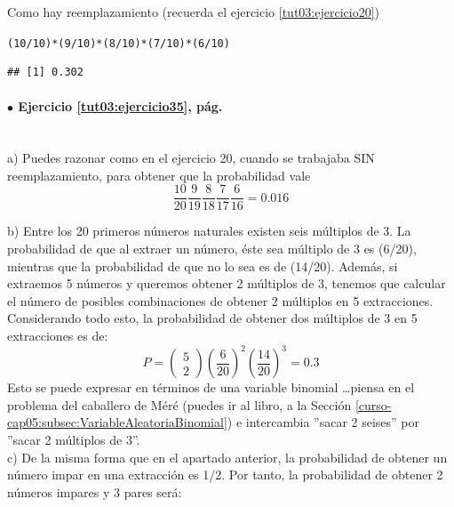 \documentclass[10pt,a4paper]{article}\usepackage[]{graphicx}\usepackage[]{color}
\makeatletter
\newcommand{\hlnum}[1]{\textcolor[rgb]{0.686,0.059,0.569}{#1}}%
\newcommand{\hlopt}[1]{\textcolor[rgb]{0,0,0}{#1}}%
\newcommand{\hlstd}[1]{\textcolor[rgb]{0.345,0.345,0.345}{#1}}%
\newenvironment{kframe}{%
 \def\at@end@of@kframe{}%
 \ifinner\ifhmode%
  \def\at@end@of@kframe{\end{minipage}}%
  \begin{minipage}{\columnwidth}%
 \fi\fi%
 \def\FrameCommand##1{\hskip\@totalleftmargin \hskip-\fboxsep
 \colorbox{shadecolor}{##1}\hskip-\fboxsep
     \hskip-\linewidth \hskip-\@totalleftmargin \hskip\columnwidth}%
 \MakeFramed {\advance\hsize-\width
   \@totalleftmargin\z@ \linewidth\hsize
   \@setminipage}}%
 {\par\unskip\endMakeFramed%
 \at@end@of@kframe}
\newenvironment{knitrout}{}{} %
\makeatother
\begin{document}
Como hay reemplazamiento (recuerda el ejercicio \ref{tut03:ejercicio20})
\begin{knitrout}
\color{fgcolor}\begin{kframe}
\begin{alltt}
\hlstd{(}\hlnum{10}\hlopt{/}\hlnum{10}\hlstd{)}\hlopt{*}\hlstd{(}\hlnum{9}\hlopt{/}\hlnum{10}\hlstd{)}\hlopt{*}\hlstd{(}\hlnum{8}\hlopt{/}\hlnum{10}\hlstd{)}\hlopt{*}\hlstd{(}\hlnum{7}\hlopt{/}\hlnum{10}\hlstd{)}\hlopt{*}\hlstd{(}\hlnum{6}\hlopt{/}\hlnum{10}\hlstd{)}
\end{alltt}
\begin{verbatim}
## [1] 0.302
\end{verbatim}
\end{kframe}
\end{knitrout}

\paragraph{\bf $\bullet$ Ejercicio \ref{tut03:ejercicio35}, pág. \pageref{tut03:ejercicio35}}
\label{tut03:ejercicio35:sol}\quad\\
a) Puedes razonar como en el ejercicio 20, cuando se trabajaba SIN reemplazamiento, para obtener 
que la probabilidad 
vale $$\frac{10}{20}\frac{9}{19}\frac{8}{18}\frac{7}{17}\frac{6}{16}=0\text{.}016$$

b) Entre los 20 primeros n\'umeros naturales existen seis m\'ultiplos de 3. La probabilidad de que al extraer un n\'umero, \'este sea m\'ultiplo
de 3 es (6/20), mientras que la probabilidad de que no lo sea es de (14/20). Adem\'as, si extraemos 5 n\'umeros y queremos obtener
2 m\'ultiplos de 3, tenemos que calcular el n\'umero de posibles combinaciones de obtener 2 m\'ultiplos en 5 extracciones.
Considerando todo esto, la probabilidad de obtener dos m\'ultiplos de 3 en 5 extracciones es de:
$$P=\left(\begin{array}{c}5 \\ 2 \end{array} \right)\left(\frac{6}{20}\right)^2
\left(\frac{14}{20}\right)^3=0\text{.}3$$
Esto se puede expresar en términos de una variable binomial \dots piensa en el problema del caballero de Méré 
(puedes ir al libro, 
a la Sección \ref{curso-cap05:subsec:VariableAleatoriaBinomial}) e intercambia ''sacar 2 seises'' por ''sacar 2 múltiplos de 3''.\\

c) De la misma forma que en el apartado anterior, la probabilidad de obtener un n\'umero impar en una extracci\'on es 1/2. Por tanto, la 
probabilidad de obtener 2  n\'umeros impares y 3 pares ser\'a:
\end{document}
